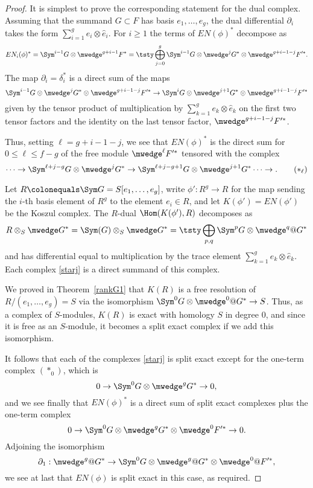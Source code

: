 \begin{proof}
It is simplest to prove the corresponding statement for the dual complex. 
Assuming that the summand $G\subset F$ has basis $e_{1},
\dots, e_{g}$,
the dual differential $\partial_{i}$ takes the form $\sum_{i=1}^{g}
e_{i}\otimes \hat e_{i}$.
For $i\geq 1$ the terms of $EN(\phi)^{*}$ decompose as
$$
EN_{i}(\phi)^{*} = \Sym^{i-1}G \otimes  \mwedge^{g+i-1}F^{*}  =
\tsty\bigoplus\limits_{j=0}^{g} \Sym^{i-1}G \otimes  \mwedge^{j}G^{*} \otimes
\mwedge^{g+i-1-j}F'^{*}.
$$
The map $\partial_{i}= \delta_{i}^{*}$ is a direct sum
of the maps
$$
\Sym^{i-1}G \otimes  \mwedge^{j}G^{*} \otimes \mwedge^{g+i-1-j}F'^{*}
\to
\Sym^{i}G \otimes  \mwedge^{j+1}G^{*} \otimes \mwedge^{g+i-1-j}F'^{*}
$$
given by the tensor product of multiplication by $\sum_{k=1}^{g} e_{k}\otimes
\hat e_{k}$
on the first two tensor factors and the identity on the last tensor factor,
$\mwedge^{g+i-1-j}F'^{*}$.

Thus, setting $\ell = g+i-1-j$, we see that   $EN(\phi)^{*}$ is the direct sum for
$0\leq \ell \leq f-g$ of the free module 
$\mwedge^{\ell}F'^{*}$ tensored with the complex
\begin{equation}
\cdots\to \Sym^{\ell + j -g}G \otimes  \mwedge^{j}G^{*}  \to
 \Sym^{\ell + j -g+1}G \otimes  \mwedge^{j+1}G^{*}\cdots\to .
\tag{$*_\ell$}
\label{starj}
\end{equation}


Let $R \colonequals \Sym G = S[e_{1}, \dots, e_{g}]$,  write 
$\phi': R^{g} \to R$ for the map sending the $i$-th basis
element of $R^{g}$ to the element $e_{i}\in R$, and let $K(\phi') = EN(\phi')$
be the Koszul complex. The $R$-dual $\Hom(K(\phi'), R)$ 
%
decomposes as
$$
R\otimes_{S}\mwedge G^* =   \Sym(G)\otimes_{S} \mwedge G^* = 
\tsty\bigoplus\limits_{p,q}\Sym^{p}G\otimes\mwedge^{q}@G^*
\vspace*{-3pt}
$$
and has differential equal to multiplication by the trace element $\sum_{k=1}^{g} e_{k}\otimes
\hat e_{k}$. Each complex \eqref{starj} is a direct summand of this complex.

We 
proved
in Theorem~\ref{rankG1} that $K(R)$ is a free resolution
of $R/(e_1, \dots, e_g)=S$ via the isomorphism
 $\Sym^{0}G\otimes \smash{\mwedge^{0}@G^*}\to S$. Thus,
 as a complex of $S$-modules, $K(R)$
 is exact with homology $S$ in degree 0, and since it is free as an $S$-module,
 it becomes a split exact complex if we add this isomorphism.
 
It follows
that each of the complexes \eqref{starj} is split exact except for the
one-term complex $(*_{0})$, which is
$$
0\to \Sym^{0}G\otimes\mwedge^{g}G^{*}\to 0,
$$
and we see finally that $EN(\phi)^{*}$ is a direct sum of split exact complexes
plus the one-term complex
$$
0\to \Sym^{0}G\otimes\mwedge^{g}G^{*}\otimes \mwedge^{0}F'^{*} \to 0.
$$
Adjoining the isomorphism
$$
\partial_{1}: \mwedge^{g}@G^{*} \to
\Sym^{0}G\otimes\mwedge^{g}@G^{*}\otimes \mwedge^{0}@F'^{*},
$$
  we see at last that $EN(\phi)$ is split exact in this case, as required.


\end{proof}
